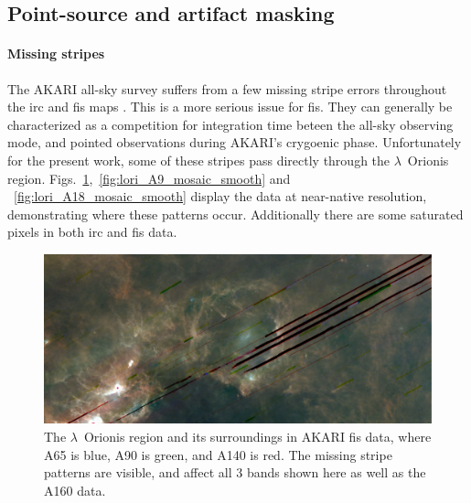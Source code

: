       \subsection{Point-source and artifact masking}

        \paragraph{Missing stripes}
          The AKARI all-sky survey suffers from a few missing stripe errors throughout the \acrshort{irc} and \acrshort{fis} maps \citep{ishihara10, doi15}. This is a more serious issue for \acrshort{fis}. They can generally be characterized as a competition for integration time beteen the all-sky observing mode, and pointed observations during AKARI's crygoenic phase. Unfortunately for the present work, some of these stripes pass directly through the $\lambda$~Orionis region. Figs.~\ref{fig:LOri_FIS_color},~\ref{fig:lori_A9_mosaic_smooth} and ~\ref{fig:lori_A18_mosaic_smooth} display the data at near-native resolution, demonstrating where these patterns occur. Additionally there are some saturated pixels in both \acrshort{irc} and \acrshort{fis} data.
            \begin{figure}
              \includegraphics[width=\textwidth]{../Plots/ch_lori/lori_fis_rgb.pdf}
              \centering
              \caption{The $\lambda$~Orionis region and its surroundings in AKARI \acrshort{fis} data, where A65 is blue, A90 is green, and A140 is red. The missing stripe patterns are visible, and affect all 3 bands shown here as well as the A160 data. }
              \label{fig:LOri_FIS_color}
            \end{figure}
